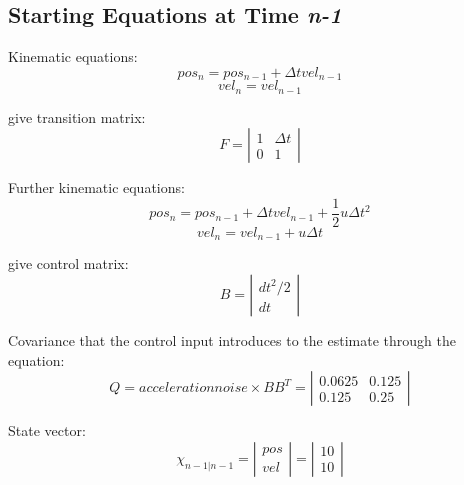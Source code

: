 \documentclass[12pt]{article}
\begin{document}
\subsection{Starting Equations at Time \textit{n-1}}
Kinematic equations:
\begin{equation}
pos_n = pos_{n-1} + \Delta t vel_{n-1}
\end{equation}
\begin{equation}
vel_n = vel_{n-1}
\end{equation}

give transition matrix:
\begin{equation}
F 
=
\left |  \begin{array}{cc}
1 & \Delta t \\
0 & 1
\end{array}  \right |
\end{equation}

Further kinematic equations:
\begin{equation}
pos_n = pos_{n-1} + \Delta t vel_{n-1} + \frac{1}{2} u \Delta t^2
\end{equation}
\begin{equation}
vel_n = vel_{n-1} + u \Delta t
\end{equation}

give control matrix:
\begin{equation}
B
=
\left |  \begin{array}{c}
dt^2/2 \\
dt
\end{array}  \right |
\end{equation}

Covariance that the control input introduces to the estimate through the equation:
\begin{equation}\label{eq:controlE}
Q
=
acceleration noise \times BB^T
=
\left |  \begin{array}{cc}
0.0625 & 0.125 \\
0.125 & 0.25
\end{array}  \right |
\end{equation}

State vector:
\begin{equation}\label{eq:state}
\chi_{n-1|n-1} 
=
\left |  \begin{array}{c}
pos \\
vel
\end{array}  \right |
=
\left |  \begin{array}{c}
10 \\
10
\end{array}  \right |
\end{equation}
\end{document}
